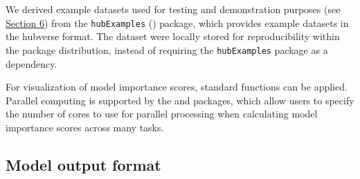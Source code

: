 \documentclass[
  article,
  shortnames,
  notitle]{jss}
\begin{document}
We derived example datasets used for testing and demonstration purposes
(see \hyperref[sec:examples]{Section 6}) from the \texttt{hubExamples}
(\citet{Rpackage-hubExamples}) package, which provides example datasets
in the hubverse format. The dataset were locally stored for
reproducibility within the package distribution, instead of requiring
the \texttt{hubExamples} package as a dependency.

For visualization of model importance scores, standard 
\citep{Rpackage-ggplot2} functions can be applied. Parallel computing is
supported by the  \citep{Rpackage-furrr} and 
\citep{Rpackage-future} packages, which allow users to specify the
number of cores to use for parallel processing when calculating model
importance scores across many tasks.

\subsection{Model output format}\label{subsec:model_output_format}
\end{document}
